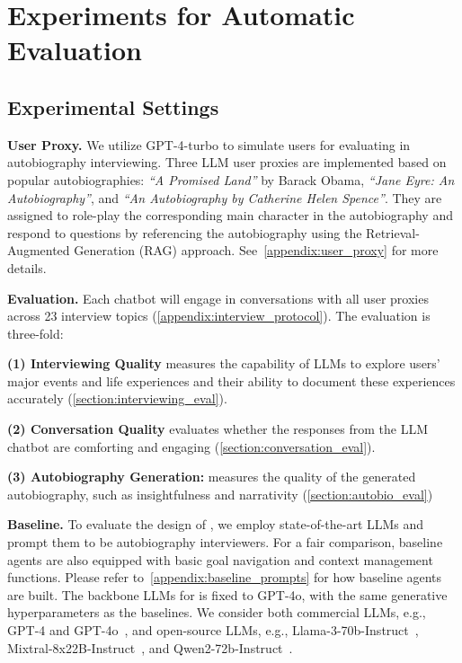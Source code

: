 
\section{Experiments for Automatic Evaluation}\label{sec:automatic_eval_exp}


\subsection{Experimental Settings}
\noindent\textbf{User Proxy.} We utilize GPT-4-turbo to simulate users for evaluating \methodname in autobiography interviewing. Three LLM user proxies are implemented based on popular autobiographies: \textit{``A Promised Land''} by Barack Obama, \textit{``Jane Eyre: An Autobiography''}, and \textit{``An Autobiography by Catherine Helen Spence''}. They are assigned to role-play the corresponding main character in the autobiography and respond to questions by referencing the autobiography using the Retrieval-Augmented Generation (RAG) approach. See~\cref{appendix:user_proxy} for more details.


\noindent\textbf{Evaluation.} Each chatbot will engage in conversations with all user proxies across 23 interview topics (\cref{appendix:interview_protocol}). The evaluation is three-fold:

\noindent\textbf{(1) Interviewing Quality} measures the capability of LLMs to explore users' major events and life experiences and their ability to document these experiences accurately (\cref{section:interviewing_eval}).
    
\noindent\textbf{(2) Conversation Quality} evaluates whether the responses from the LLM chatbot are comforting and engaging (\cref{section:conversation_eval}).
    
\noindent\textbf{(3) Autobiography Generation:} measures the quality of the generated autobiography, such as insightfulness and narrativity (\cref{section:autobio_eval})

\noindent\textbf{Baseline.} To evaluate the design of \methodname, we employ state-of-the-art LLMs and prompt them to be autobiography interviewers.
For a fair comparison, baseline agents are also equipped with basic goal navigation and context management functions. Please refer to~\cref{appendix:baseline_prompts} for how baseline agents are built. The backbone LLMs for \methodname is fixed to GPT-4o, with the same generative hyperparameters as the baselines. We consider both commercial LLMs, e.g., GPT-4 and GPT-4o~\cite{achiam2023gpt}, and open-source LLMs, e.g., Llama-3-70b-Instruct~\cite{llama3}, Mixtral-8x22B-Instruct~\cite{jiang2024mixtral}, and Qwen2-72b-Instruct~\cite{bai2023qwen}. 


